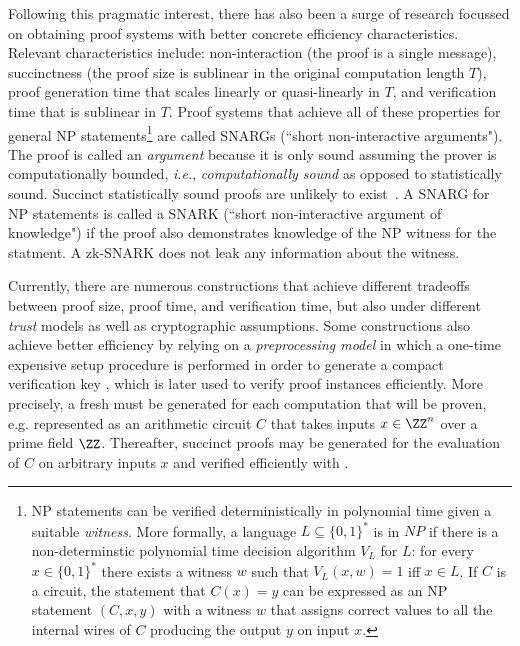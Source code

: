 Following this pragmatic interest, there has also been a surge of research focussed on obtaining proof systems with better concrete efficiency characteristics. Relevant characteristics include: non-interaction (the proof is a single message), succinctness (the proof size is sublinear in the original computation length $T$), proof generation time that scales linearly or quasi-linearly in $T$, and verification time that is sublinear in $T$. Proof systems that achieve all of these properties for general NP statements\footnote{NP statements can be verified deterministically in polynomial time given a suitable \emph{witness}. More formally, a language $L \subseteq \{0,1\}^*$ is in $NP$ if there is a non-determinstic polynomial time decision algorithm $V_L$ for $L$: for every $x \in \{0,1\}^*$ there exists a witness $w$ such that $V_L(x, w) = 1$ iff $x \in L$. If $C$ is a circuit, the statement that $C(x) = y$ can be expressed as an NP statement $(C, x, y)$ with a witness $w$ that assigns correct values to all the internal wires of $C$ producing the output $y$ on input $x$.} are called SNARGs (``short non-interactive arguments"). 
The proof is called an \emph{argument} because it is only sound assuming the prover is computationally bounded, \emph{i.e.}, \emph{computationally sound} as opposed to statistically sound. Succinct statistically sound proofs are unlikely to exist~\cite{CC:GolVadWig02,ICALP:Wee05}. 
A SNARG for NP statements is called a SNARK (``short non-interactive argument of knowledge") if the proof also demonstrates knowledge of the NP witness for the statment. A zk-SNARK does not leak any information about the witness. 


Currently, there are numerous constructions that achieve different tradeoffs between proof size, proof time, and verification time, but also under different \emph{trust} models as well as cryptographic assumptions. %
Some constructions also achieve better efficiency by relying on a \emph{preprocessing model} in which a one-time expensive setup procedure is performed in order to generate a compact verification key , which is later used to verify proof instances efficiently. More precisely, a fresh  must be generated for each computation that will be proven, e.g. represented as an arithmetic circuit $C$ that takes inputs $x \in \ZZ^n$ over a prime field $\ZZ$. Thereafter, succinct proofs may be generated for the evaluation of $C$ on arbitrary inputs $x$ and verified efficiently with . 

